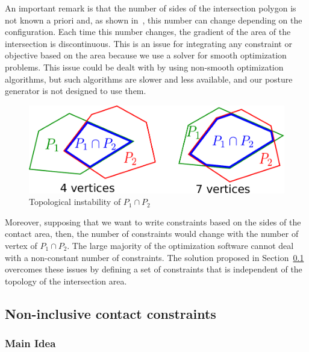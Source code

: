 An important remark is that the number of sides of the intersection polygon is not known a priori and, as shown in~, this number can change depending on the configuration.
Each time this number changes, the gradient of the area of the intersection is discontinuous.
This is an issue for integrating any constraint or objective based on the area because we use a solver for smooth optimization problems.
This issue could be dealt with by using non-smooth optimization algorithms, but such algorithms are slower and less available, and our posture generator is not designed to use them.
\begin{figure}[!htb]
  \centering
  \includegraphics[width=0.6\columnwidth]{polygon-inter.pdf}
  \caption{Topological instability of $P_1 \cap P_2$}
\label{fig:polygon-inter}
\end{figure}
Moreover, supposing that we want to write constraints based on the sides of the contact area, then, the number of constraints would change with the number of vertex of $P_1 \cap P_2$.
The large majority of the optimization software cannot deal with a non-constant number of constraints.
The solution proposed in Section~\ref{subsec:ellipse} overcomes these issues by defining a set of constraints that is independent of the topology of the intersection area.



\subsection{Non-inclusive contact constraints}
\label{subsec:ellipse}




\subsubsection{Main Idea}
\label{subsubsec:idea}


